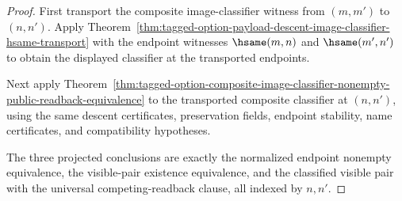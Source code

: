 \begin{proof}
First transport the composite image-classifier witness from $(m,m')$ to
$(n,n')$. Apply
Theorem~\ref{thm:tagged-option-payload-descent-image-classifier-hsame-transport}
with the endpoint witnesses $\hsame(m,n)$ and $\hsame(m',n')$ to obtain the
displayed classifier at the transported endpoints.

Next apply
Theorem~\ref{thm:tagged-option-composite-image-classifier-nonempty-public-readback-equivalence}
to the transported composite classifier at $(n,n')$, using the same descent
certificates, preservation fields, endpoint stability, name certificates, and
compatibility hypotheses.

The three projected conclusions are exactly the normalized endpoint nonempty
equivalence, the visible-pair existence equivalence, and the classified visible
pair with the universal competing-readback clause, all indexed by $n,n'$.
\end{proof}

